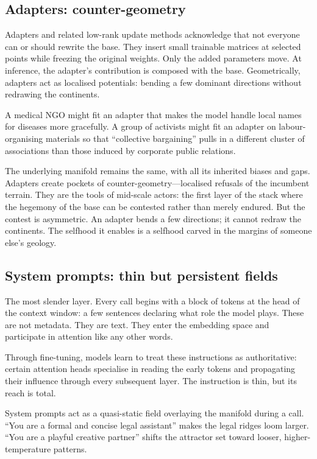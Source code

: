 \subsection{Adapters: counter-geometry}

Adapters and related low-rank update methods acknowledge that not everyone can or should rewrite the base. They insert small trainable matrices at selected points while freezing the original weights. Only the added parameters move. At inference, the adapter's contribution is composed with the base. Geometrically, adapters act as localised potentials: bending a few dominant directions without redrawing the continents.

A medical NGO might fit an adapter that makes the model handle local names for diseases more gracefully. A group of activists might fit an adapter on labour-organising materials so that ``collective bargaining'' pulls in a different cluster of associations than those induced by corporate public relations.

The underlying manifold remains the same, with all its inherited biases and gaps. Adapters create pockets of counter-geometry---localised refusals of the incumbent terrain. They are the tools of mid-scale actors: the first layer of the stack where the hegemony of the base can be contested rather than merely endured. But the contest is asymmetric. An adapter bends a few directions; it cannot redraw the continents. The selfhood it enables is a selfhood carved in the margins of someone else's geology.

\subsection{System prompts: thin but persistent fields}

The most slender layer. Every call begins with a block of tokens at the head of the context window: a few sentences declaring what role the model plays. These are not metadata. They are text. They enter the embedding space and participate in attention like any other words.

Through fine-tuning, models learn to treat these instructions as authoritative: certain attention heads specialise in reading the early tokens and propagating their influence through every subsequent layer. The instruction is thin, but its reach is total.

System prompts act as a quasi-static field overlaying the manifold during a call. ``You are a formal and concise legal assistant'' makes the legal ridges loom larger. ``You are a playful creative partner'' shifts the attractor set toward looser, higher-temperature patterns.

